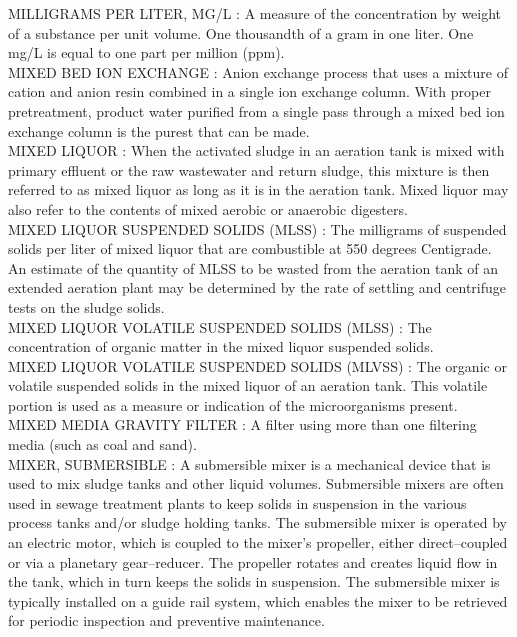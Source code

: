 \vspace{0.15cm}
MILLIGRAMS PER LITER, MG/L :  A measure of the concentration by weight of a substance per unit volume. One thousandth of a gram in one liter. One mg/L is equal to one part per million (ppm).\\
\vspace{0.15cm}
MIXED BED ION EXCHANGE :  Anion exchange process that uses a mixture of cation and anion resin combined in a single ion exchange column. With proper pretreatment, product water purified from a single pass through a mixed bed ion exchange column is the purest that can be made.\\
\vspace{0.15cm}
MIXED LIQUOR :  When the activated sludge in an aeration tank is mixed with primary effluent or the raw wastewater and return sludge, this mixture is then referred to as mixed liquor as long as it is in the aeration tank. Mixed liquor may also refer to the contents of mixed aerobic or anaerobic digesters.\\
\vspace{0.15cm}
MIXED LIQUOR SUSPENDED SOLIDS (MLSS) :   The milligrams of suspended solids per liter of mixed liquor that are combustible at 550 degrees Centigrade. An estimate of the quantity of MLSS to be wasted from the aeration tank of an extended aeration plant may be determined by the rate of settling and centrifuge tests on the sludge solids.\\
\vspace{0.15cm}
MIXED LIQUOR VOLATILE SUSPENDED SOLIDS (MLSS) :  The concentration of organic matter in the mixed liquor suspended solids. \\
\vspace{0.15cm}
MIXED LIQUOR VOLATILE SUSPENDED SOLIDS (MLVSS) :  The organic or volatile suspended solids in the mixed liquor of an aeration tank. This volatile portion is used as a measure or indication of the microorganisms present.\\
\vspace{0.15cm}
MIXED MEDIA GRAVITY FILTER :   A filter using more than one filtering media (such as coal and sand).\\
\vspace{0.15cm}
MIXER, SUBMERSIBLE :   A submersible mixer is a mechanical device that is used to mix sludge tanks and other liquid volumes. Submersible mixers are often used in sewage treatment plants to keep solids in suspension in the various process tanks and/or sludge holding tanks. The submersible mixer is operated by an electric motor, which is coupled to the mixer’s propeller, either direct–coupled or via a planetary gear–reducer. The propeller rotates and creates liquid flow in the tank, which in turn keeps the solids in suspension. The submersible mixer is typically installed on a guide rail system, which enables the mixer to be retrieved for periodic inspection and preventive maintenance.\\

